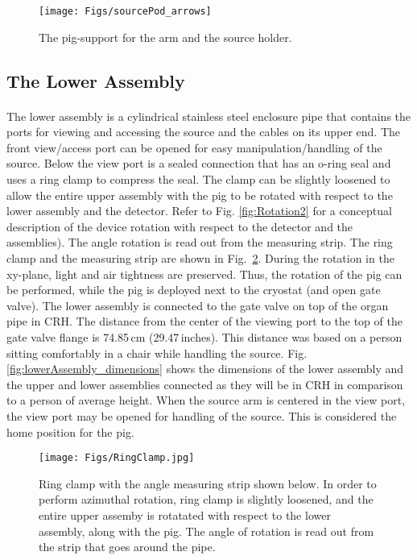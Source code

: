 \begin{figure}[htbp]
 \centering
  \texttt{[image: Figs/sourcePod\_arrows]}
  \caption{The pig-support for the arm and the source holder.}
  \label{fig:sourcePod_arrows}
\end{figure}

 \subsection{The Lower Assembly} \label{The Lower Assembly}
 \paragraph{}
    The lower assembly is a cylindrical stainless steel enclosure pipe that contains the ports for viewing and accessing the source and the cables on its upper end. The front view/access port can be opened for easy manipulation/handling of the source. Below the view port is a sealed connection that has an o-ring seal and uses a ring clamp to compress the seal. The clamp can be slightly loosened to allow the entire upper assembly with the pig to be rotated with respect to the lower assembly and the detector. Refer to Fig. \ref{fig:Rotation2} for a conceptual description of the device rotation with respect to the detector and the assemblies). The angle rotation is read out from the measuring strip. The ring clamp and the measuring strip are shown in Fig.~\ref{fig:ring_clamp}. During the rotation in the xy-plane, light and air tightness are preserved. Thus, the rotation of the pig can be performed, while the pig is deployed next to the cryostat (and open  gate valve).  The lower assembly is connected to the gate valve on top of the organ pipe in CRH.  The distance from the center of the viewing port to the top of the gate valve flange is 74.85\,cm (29.47\,inches). This distance was based on a person sitting comfortably in a chair while handling the source.  Fig. \ref{fig:lowerAssembly_dimensions} shows the dimensions of the lower assembly and the upper and lower assemblies connected as they will be in CRH in comparison to a person of average height.   When the source arm is centered in the view port, the view port may be opened for handling of the source.  This is considered the home position for the pig.  

\begin{figure}[htbp]
 \centering
  \texttt{[image: Figs/RingClamp.jpg]}
  \caption{Ring clamp  with the angle measuring strip shown below. In order to perform azimuthal rotation, ring clamp is slightly loosened, and the entire upper assemby is rotatated with respect to the lower assembly, along with the pig. The angle of rotation is read out from the strip that goes around the pipe. }
  \label{fig:ring_clamp}
\end{figure} 

